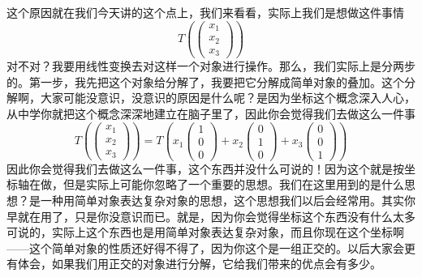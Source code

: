 \documentclass[a4paper,12pt]{article}
\begin{document}
这个原因就在我们今天讲的这个点上，我们来看看，实际上我们是想做这件事情
\begin{equation}
T \left (
\begin{pmatrix}  
  x_{1}  \\  
  x_{2}  \\  
  x_{3}   
\end{pmatrix} \right )
\end{equation}
对不对？我要用线性变换去对这样一个对象进行操作。那么，我们实际上是分两步的。第一步，我先把这个对象给分解了，我要把它分解成简单对象的叠加。这个分解啊，大家可能没意识，没意识的原因是什么呢？是因为坐标这个概念深入人心，从中学你就把这个概念深深地建立在脑子里了，因此你会觉得我们去做这么一件事
\begin{equation}
T \left (
\begin{pmatrix}  
  x_{1}  \\  
  x_{2}  \\  
  x_{3}   
\end{pmatrix} \right )=
T \left (
x_1
\begin{pmatrix}  
  1  \\  
  0  \\  
  0   
\end{pmatrix}+
x_2
\begin{pmatrix}  
  0  \\  
  1 \\  
  0   
\end{pmatrix}+
x_3
\begin{pmatrix}  
  0  \\  
  0  \\  
  1   
\end{pmatrix}
\right )
\end{equation}
因此你会觉得我们去做这么一件事，这个东西并没什么可说的！因为这个就是按坐标轴在做，但是实际上可能你忽略了一个重要的思想。我们在这里用到的是什么思想？是一种用简单对象表达复杂对象的思想，这个思想我们以后会经常用。其实你早就在用了，只是你没意识而已。就是，因为你会觉得坐标这个东西没有什么太多可说的，实际上这个东西也是用简单对象表达复杂对象，而且你现在这个坐标啊——这个简单对象的性质还好得不得了，因为你这个是一组正交的。以后大家会更有体会，如果我们用正交的对象进行分解，它给我们带来的优点会有多少。
\end{document}

